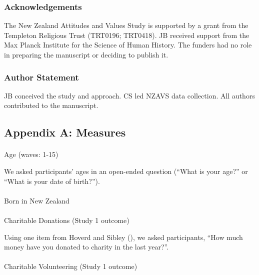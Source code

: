 \documentclass[
  single column]{article}
\makeatletter
\let\oldparagraph\paragraph
\renewcommand{\paragraph}{
    \@ifstar
      \xxxParagraphStar
      \xxxParagraphNoStar
  }
\newcommand{\xxxParagraphStar}[1]{\oldparagraph*{#1}\mbox{}}
\newcommand{\xxxParagraphNoStar}[1]{\oldparagraph{#1}\mbox{}}
\makeatother
\begin{document}
\subsubsection{Acknowledgements}\label{acknowledgements}

The New Zealand Attitudes and Values Study is supported by a grant from
the Templeton Religious Trust (TRT0196; TRT0418). JB received support
from the Max Planck Institute for the Science of Human History. The
funders had no role in preparing the manuscript or deciding to publish
it.

\subsubsection{Author Statement}\label{author-statement}

JB conceived the study and approach. CS led NZAVS data collection. All
authors contributed to the manuscript.

\newpage{}

\subsection{Appendix A: Measures}\label{appendix-measures}

\paragraph{Age (waves: 1-15)}\label{age-waves-1-15}

We asked participants' ages in an open-ended question (``What is your
age?'' or ``What is your date of birth?'').

\paragraph{Born in New Zealand}\label{born-in-new-zealand}

\paragraph{Charitable Donations (Study 1
outcome)}\label{charitable-donations-study-1-outcome}

Using one item from Hoverd and Sibley
(), we asked participants,
``How much money have you donated to charity in the last year?''.

\paragraph{Charitable Volunteering (Study 1
outcome)}\label{charitable-volunteering-study-1-outcome}
\end{document}
